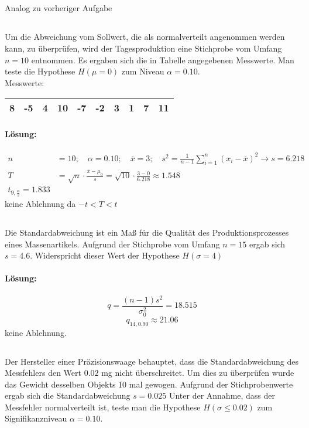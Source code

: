 \documentclass[ngerman]{scrartcl}
\begin{document}
\subsection{}
Analog zu vorheriger Aufgabe
\subsection{}
Um die Abweichung vom Sollwert, die als normalverteilt angenommen werden kann, zu überprüfen, wird der Tagesproduktion eine Stichprobe vom Umfang $n=10$ entnommen. Es ergaben sich die in Tabelle angegebenen Messwerte. Man teste die Hypothese $H(\mu=0)$ zum Niveau $\alpha = 0.10$.\\
Messwerte:\\
\begin{tabular}{c c c c c c c c c c}
\hline
8& -5& 4& 10& -7& -2& 3& 1& 7& 11\\\hline
\end{tabular}
\paragraph{Lösung:}
\begin{align*}
n&=10;\quad \alpha =0.10;\quad \overline{x}=3;\quad s^2=\frac{1}{n-1}\sum_{i=1}^{n}\left(x_i - \overline{x}\right)^2\rightarrow s = 6.218\\
T &= \sqrt{n}\cdot \frac{\overline{x} - \mu_0}{s} = \sqrt{10}\cdot \frac{3 - 0}{6.218}\approx 1.548\\
t_{9,\frac{\alpha}{2}} = 1.833
\end{align*}
keine Ablehnung da $-t<T<t$
\subsection{}
Die Standardabweichung ist ein Maß für die Qualität des Produktionsprozesses eines Massenartikels. Aufgrund der Stichprobe vom Umfang $n=15$ ergab sich $s=4.6$. Widerspricht dieser Wert der Hypothese $H(\sigma = 4)$
\paragraph{Lösung:}
\[
q = \frac{(n-1) s^2}{\sigma_0^2} = 18.515
\]
\[
q_{14,0.90} \approx 21.06
\]
keine Ablehnung.
\subsection{}
Der Hersteller einer Präzisionswaage behauptet, dass die Standardabweichung des Messfehlers den Wert $0.02$ mg nicht überschreitet. Um dies zu überprüfen wurde das Gewicht desselben Objekts 10 mal gewogen. Aufgrund der Stichprobenwerte ergab sich die Standardabweichung $s=0.025$ Unter der Annahme, dass der Messfehler normalverteilt ist, teste man die Hypothese $H(\sigma \le 0.02)$ zum Signifikanzniveau $\alpha = 0.10$.
\end{document}
